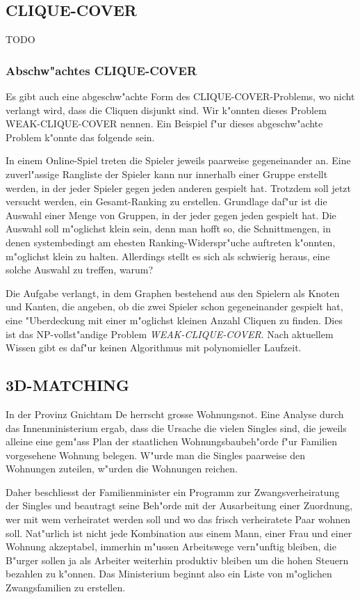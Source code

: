 \subsection{CLIQUE-COVER}
TODO

\subsubsection{Abschw"achtes CLIQUE-COVER}
Es gibt auch eine abgeschw"achte Form des CLIQUE-COVER-Problems, wo
nicht verlangt wird, dass die Cliquen disjunkt sind.
Wir k"onnten dieses Problem WEAK-CLIQUE-COVER nennen.
Ein Beispiel f"ur dieses abgeschw"achte Problem k"onnte das folgende sein.

In einem Online-Spiel treten die Spieler jeweils paarweise gegeneinander an.
Eine zuverl"assige Rangliste der Spieler kann nur innerhalb
einer Gruppe erstellt werden, in der jeder Spieler gegen
jeden anderen gespielt hat. Trotzdem soll jetzt versucht werden,
ein Gesamt-Ranking zu erstellen. Grundlage daf"ur ist die Auswahl
einer Menge von Gruppen, in der jeder gegen jeden gespielt hat.
Die Auswahl soll m"oglichst klein sein, denn man hofft so, die
Schnittmengen, in denen systembedingt am ehesten Ranking-Widerspr"uche
auftreten k"onnten, m"oglichst klein zu halten. Allerdings stellt es
sich als schwierig heraus, eine solche Auswahl zu treffen, warum?

\medskip

Die Aufgabe verlangt, in dem Graphen bestehend aus den Spielern
als Knoten und Kanten, die angeben, ob die zwei Spieler schon gegeneinander
gespielt hat, eine "Uberdeckung mit einer m"oglichst
kleinen Anzahl Cliquen zu finden. Dies ist das NP-vollst"andige Problem
{\it WEAK-CLIQUE-COVER}. Nach aktuellem Wissen gibt es daf"ur keinen
Algorithmus mit polynomieller Laufzeit.

\subsection{3D-MATCHING}
In der Provinz Gnichtam De herrscht grosse Wohnungsnot.
Eine Analyse durch das Innenministerium ergab, dass die Ursache
die vielen Singles sind, die jeweils alleine eine gem"ass
Plan der staatlichen Wohnungsbaubeh"orde f"ur Familien vorgesehene
Wohnung belegen.
W"urde man die Singles paarweise den Wohnungen zuteilen, w"urden die
Wohnungen reichen.

Daher beschliesst der Familienminister ein Programm zur Zwangsverheiratung
der Singles und beautragt seine Beh"orde mit der Ausarbeitung einer Zuordnung,
wer mit wem verheiratet werden soll und wo das frisch verheiratete Paar
wohnen soll.
Nat"urlich ist nicht jede Kombination aus einem Mann,
einer Frau und einer Wohnung akzeptabel, immerhin m"ussen 
Arbeitswege vern"unftig bleiben, die B"urger sollen ja als 
Arbeiter weiterhin produktiv bleiben um die hohen Steuern bezahlen zu k"onnen.
Das Ministerium beginnt also ein Liste von m"oglichen Zwangsfamilien
zu erstellen.

